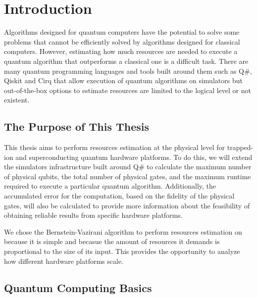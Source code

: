 %
%
\chapter {Introduction}

Algorithms designed for quantum computers have the potential to solve some problems that cannot be efficiently solved by algorithms designed for classical computers. However, estimating how much resources are needed to execute a quantum algorithm that outperforms a classical one is a difficult task. There are many quantum programming languages and tools built around them such as Q\#\cite{QSharp_Svore_2018}, Qiskit\cite{Qiskit_2021} and Cirq\cite{Cirq_2021} that allow execution of quantum algorithms on simulators but out-of-the-box options to estimate resources are limited to the logical level or not existent.

\section{The Purpose of This Thesis}

This thesis aims to perform resources estimation at the physical level for trapped-ion and superconducting quantum hardware platforms. To do this, we will extend the simulators infrastructure built around Q\# to calculate the maximum number of physical qubits, the total number of physical gates, and the maximum runtime required to execute a particular quantum algorithm. Additionally, the accumulated error for the computation, based on the fidelity of the physical gates, will also be calculated to provide more information about the feasibility of obtaining reliable results from specific hardware platforms.


We chose the Bernstein-Vazirani algorithm to perform resources estimation on because it is simple and becasue the amount of resources it demands is proportional to the size of its input. This provides the opportunity to analyze how different hardware platforms scale.

\section{Quantum Computing Basics}

